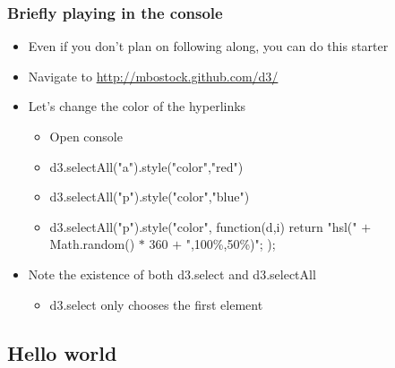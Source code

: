 \documentclass{beamer}
\begin{document}
\begin{frame}
    \frametitle{Briefly playing in the console}
    \begin{itemize}
    \item Even if you don't plan on following along, you can do this starter
    \item Navigate to \href{http://mbostock.github.com/d3/}{http://mbostock.github.com/d3/}
    \item Let's change the color of the hyperlinks
        \begin{itemize}
        \item Open console
        \item d3.selectAll("a").style("color","red")
        \item d3.selectAll("p").style("color","blue")
        \item d3.selectAll("p").style("color", function(d,i) {return "hsl(" $+$ Math.random() $*$ 360 $+$ ",100\%,50\%)"; });
        \end{itemize}
    \item Note the existence of both d3.select and d3.selectAll
        \begin{itemize}
        \item d3.select only chooses the first element
        \end{itemize}
    \end{itemize}
\end{frame}


\subsection{Hello world}
\end{document}
